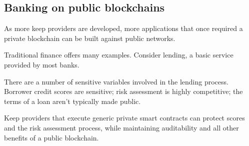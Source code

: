 \documentclass[russian,english,11pt]{article}
\begin{document}
\subsection{Banking on public blockchains}

As more keep providers are developed, more applications that once
required a private blockchain can be built against public networks.

Traditional finance offers many examples. Consider lending, a basic
service provided by most banks.

There are a number of sensitive variables involved in the lending
process. Borrower credit scores are sensitive; risk assessment is
highly competitive; the terms of a loan aren't typically made public.

Keep providers that execute generic private smart contracts can
protect scores and the risk assessment process, while maintaining
auditability and all other benefits of a public blockchain.


{}
\end{document}
